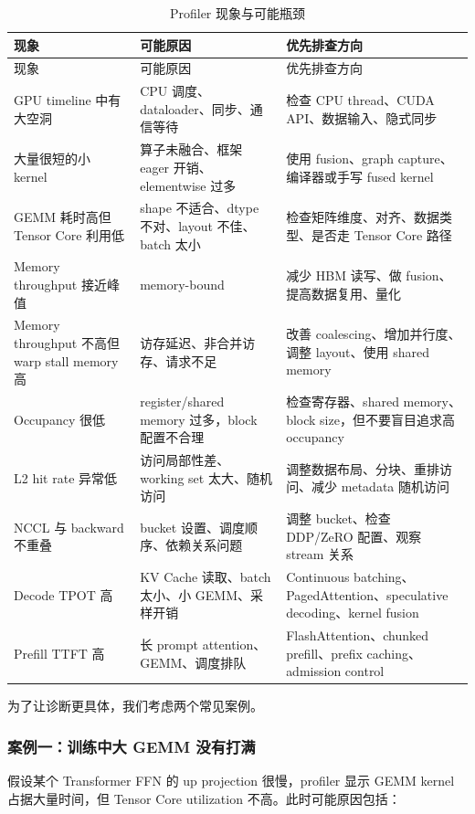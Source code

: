 \begin{longtable}{p{4.0cm}p{5.0cm}p{5.0cm}}
  \caption{Profiler 现象与可能瓶颈}
  \label{tab:profiler-diagnosis} \\
  \toprule
  现象 & 可能原因 & 优先排查方向 \\
  \midrule
  \endfirsthead
  \toprule
  现象 & 可能原因 & 优先排查方向 \\
  \midrule
  \endhead
  GPU timeline 中有大空洞 & CPU 调度、dataloader、同步、通信等待 & 检查 CPU thread、CUDA API、数据输入、隐式同步 \\
  大量很短的小 kernel & 算子未融合、框架 eager 开销、elementwise 过多 & 使用 fusion、graph capture、编译器或手写 fused kernel \\
  GEMM 耗时高但 Tensor Core 利用低 & shape 不适合、dtype 不对、layout 不佳、batch 太小 & 检查矩阵维度、对齐、数据类型、是否走 Tensor Core 路径 \\
  Memory throughput 接近峰值 & memory-bound & 减少 HBM 读写、做 fusion、提高数据复用、量化 \\
  Memory throughput 不高但 warp stall memory 高 & 访存延迟、非合并访存、请求不足 & 改善 coalescing、增加并行度、调整 layout、使用 shared memory \\
  Occupancy 很低 & register/shared memory 过多，block 配置不合理 & 检查寄存器、shared memory、block size，但不要盲目追求高 occupancy \\
  L2 hit rate 异常低 & 访问局部性差、working set 太大、随机访问 & 调整数据布局、分块、重排访问、减少 metadata 随机访问 \\
  NCCL 与 backward 不重叠 & bucket 设置、调度顺序、依赖关系问题 & 调整 bucket、检查 DDP/ZeRO 配置、观察 stream 关系 \\
  Decode TPOT 高 & KV Cache 读取、batch 太小、小 GEMM、采样开销 & Continuous batching、PagedAttention、speculative decoding、kernel fusion \\
  Prefill TTFT 高 & 长 prompt attention、GEMM、调度排队 & FlashAttention、chunked prefill、prefix caching、admission control \\
  \bottomrule
\end{longtable}

为了让诊断更具体，我们考虑两个常见案例。

\subsubsection{案例一：训练中大 GEMM 没有打满}

假设某个 Transformer FFN 的 up projection 很慢，profiler 显示 GEMM kernel 占据大量时间，但 Tensor Core utilization 不高。此时可能原因包括：

